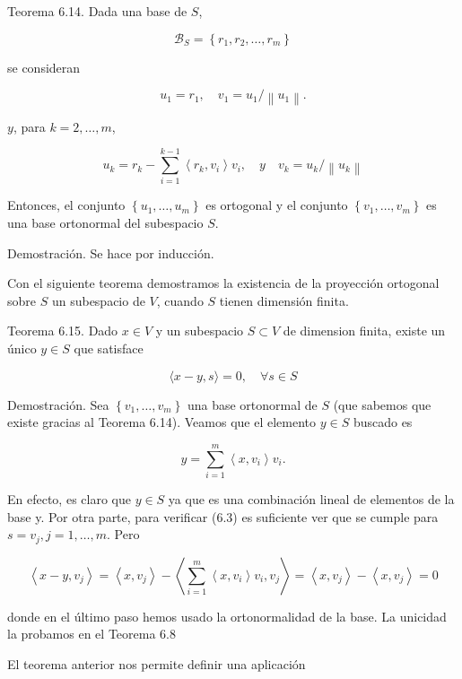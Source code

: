 \documentclass[10pt]{article}
\begin{document}
Teorema 6.14. Dada una base de $S$,

$$
\mathcal{B}_{S}=\left\{r_{1}, r_{2}, \ldots, r_{m}\right\}
$$

se consideran

$$
u_{1}=r_{1}, \quad v_{1}=u_{1} /\left\|u_{1}\right\| .
$$

$y$, para $k=2, \ldots, m$,

$$
u_{k}=r_{k}-\sum_{i=1}^{k-1}\left\langle r_{k}, v_{i}\right\rangle v_{i}, \quad y \quad v_{k}=u_{k} /\left\|u_{k}\right\|
$$

Entonces, el conjunto $\left\{u_{1}, \ldots, u_{m}\right\}$ es ortogonal y el conjunto $\left\{v_{1}, \ldots, v_{m}\right\}$ es una base ortonormal del subespacio $S$.

Demostración. Se hace por inducción.

Con el siguiente teorema demostramos la existencia de la proyección ortogonal sobre $S$ un subespacio de $V$, cuando $S$ tienen dimensión finita.

Teorema 6.15. Dado $x \in V$ y un subespacio $S \subset V$ de dimension finita, existe un único $y \in S$ que satisface


\begin{equation*}
\langle x-y, s\rangle=0, \quad \forall s \in S \tag{6.3}
\end{equation*}


Demostración. Sea $\left\{v_{1}, \ldots, v_{m}\right\}$ una base ortonormal de $S$ (que sabemos que existe gracias al Teorema 6.14). Veamos que el elemento $y \in S$ buscado es


\begin{equation*}
y=\sum_{i=1}^{m}\left\langle x, v_{i}\right\rangle v_{i} . \tag{6.4}
\end{equation*}


En efecto, es claro que $y \in S$ ya que es una combinación lineal de elementos de la base y. Por otra parte, para verificar (6.3) es suficiente ver que se cumple para $s=v_{j}, j=1, \ldots, m$. Pero

$$
\left\langle x-y, v_{j}\right\rangle=\left\langle x, v_{j}\right\rangle-\left\langle\sum_{i=1}^{m}\left\langle x, v_{i}\right\rangle v_{i}, v_{j}\right\rangle=\left\langle x, v_{j}\right\rangle-\left\langle x, v_{j}\right\rangle=0
$$

donde en el último paso hemos usado la ortonormalidad de la base. La unicidad la probamos en el Teorema 6.8

El teorema anterior nos permite definir una aplicación
\end{document}
